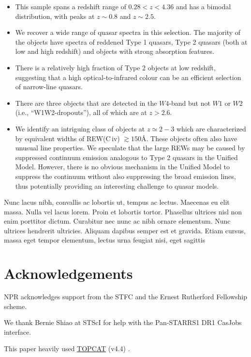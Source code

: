 \documentclass[usenatbib]{mnras}
\begin{document}
\begin{itemize}
    \item{This sample spans a redshift range of $0.28 < z < 4.36$ and has a bimodal distribution, with peaks 
        at $z\sim0.8$ and $z\sim2.5$.}
   \item{We recover a wide range of quasar spectra in this selection.  
        The majority of the objects have spectra of reddened Type 1
        quasars, Type 2 quasars (both at low and high redshift) and objects
        with strong absorption features.} 
    \item{There is a relatively high fraction of Type 2 objects at low redshift,
        suggesting that a high optical-to-infrared colour can be an efficient
        selection of narrow-line quasars.}
    \item{There are three objects that are detected in the $W4$-band but
        not $W1$ or $W2$ (i.e., ``W1W2-dropouts''), all of which are at
        $z>2.6$.}
    \item{We identify an intriguing class of objects at $z\simeq 2-3$ which are
        characterized by equivalent widths of REW(C\,{\sc iv})
        $\gtrsim150$\AA.  These objects often also have unusual line
        properties.  We speculate that the large REWs may be caused by
        suppressed continuum emission analogous to Type 2 quasars in the
        Unified Model. However, there is no obvious mechanism in the Unified
        Model to suppress the continuum without also suppressing the broad
        emission lines, thus potentially providing an interesting challenge to
        quasar models.} 
\end{itemize}
Nunc lacus nibh, convallis ac lobortis ut, tempus ac lectus. Maecenas
eu elit massa. Nulla vel lacus lorem. Proin et lobortis
tortor. Phasellus ultrices nisl non enim porttitor dictum. Curabitur
nec nunc ac nibh ornare elementum. Nunc ultrices hendrerit
ultricies. Aliquam dapibus semper est et gravida. Etiam cursus, massa
eget tempor elementum, lectus urna feugiat nisi, eget sagittis


\section*{Acknowledgements}
NPR acknowledges support from the STFC and the Ernest Rutherford Fellowship scheme. 

We thank Bernie Shiao at STScI for help with the Pan-STARRS1 DR1 CasJobs interface. 

This paper heavily used \href{http://www.star.bris.ac.uk/~mbt/topcat/}{TOPCAT} (v4.4)
\citep[][]{Taylor2005, Taylor2011}.
\end{document}
